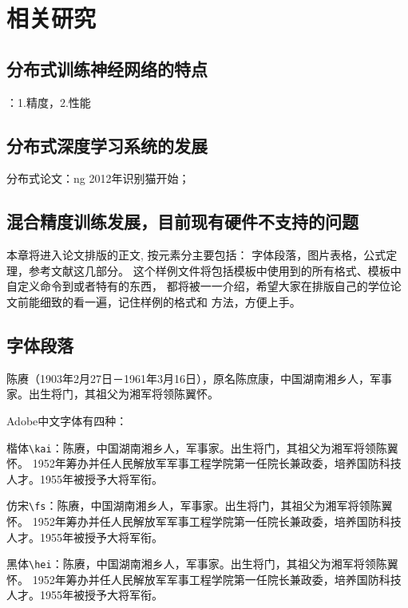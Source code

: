 \chapter{相关研究}
\label{chap:main}
\section{分布式训练神经网络的特点}
：1.精度，2.性能
\section{分布式深度学习系统的发展}
分布式论文：ng 2012年识别猫开始；
\section{混合精度训练发展，目前现有硬件不支持的问题}
本章将进入论文排版的正文, 按元素分主要包括：
{\kai 字体段落，图片表格，公式定理，参考文献}这几部分。
这个样例文件将包括模板中使用到的所有格式、模板中自定义命令到或者特有的东西，
都将被一一介绍，希望大家在排版自己的学位论文前能细致的看一遍，记住样例的格式和
方法，方便上手。

\section{字体段落}
\label{sec:font}

陈赓（1903年2月27日－1961年3月16日），原名陈庶康，中国湖南湘乡人，军事家。出生将门，其祖父为湘军将领陈翼怀。

Adobe中文字体有四种：

{\kai 楷体\verb|\kai|：陈赓，中国湖南湘乡人，军事家。出生将门，其祖父为湘军将领陈翼怀。%
1952年筹办并任人民解放军军事工程学院第一任院长兼政委，培养国防科技人才。1955年被授予大将军衔。}

{\fs 仿宋\verb|\fs|：陈赓，中国湖南湘乡人，军事家。出生将门，其祖父为湘军将领陈翼怀。%
1952年筹办并任人民解放军军事工程学院第一任院长兼政委，培养国防科技人才。1955年被授予大将军衔。}

{\hei 黑体\verb|\hei|：陈赓，中国湖南湘乡人，军事家。出生将门，其祖父为湘军将领陈翼怀。%
1952年筹办并任人民解放军军事工程学院第一任院长兼政委，培养国防科技人才。1955年被授予大将军衔。}

